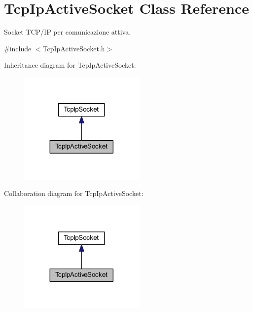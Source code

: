 \hypertarget{class_tcp_ip_active_socket}{
\section{TcpIpActiveSocket Class Reference}
\label{class_tcp_ip_active_socket}
}


Socket TCP/IP per comunicazione attiva.  




{\ttfamily \#include $<$TcpIpActiveSocket.h$>$}



Inheritance diagram for TcpIpActiveSocket:\nopagebreak
\begin{figure}[H]
\begin{center}
\leavevmode
\includegraphics[width=176pt]{class_tcp_ip_active_socket__inherit__graph}
\end{center}
\end{figure}


Collaboration diagram for TcpIpActiveSocket:\nopagebreak
\begin{figure}[H]
\begin{center}
\leavevmode
\includegraphics[width=176pt]{class_tcp_ip_active_socket__coll__graph}
\end{center}
\end{figure}

